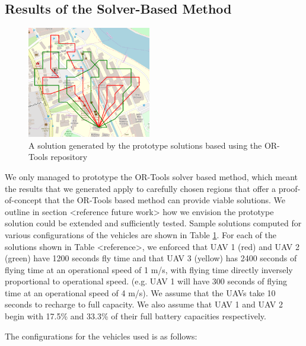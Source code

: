 \subsection{Results of the Solver-Based Method}

\begin{figure}
\begin{center}
\includegraphics[width=0.48\textwidth]{Chapters/MultiAgentCoverage/MultipleTravellingSalesman/Figs/VRPPrototypeSolution.png}
\caption{A solution generated by the prototype solutions based using the OR-Tools repository}
\label{fig:ORToolsVRPSoln}
\end{center}
\end{figure}

We only managed to prototype the OR-Tools solver based method, which meant the results that we generated apply to carefully chosen regions that offer a proof-of-concept that the OR-Tools based method can provide viable solutions. We outline in section <reference future work> how we envision the prototype solution could be extended and sufficiently tested. Sample solutions computed for various configurations of the vehicles are shown in Table \ref{fig:ORToolsVRPSoln}. For each of the solutions shown in Table <reference>, we enforced that UAV 1 (red) and UAV 2 (green) have 1200 seconds fly time and that UAV 3 (yellow) has 2400 seconds of flying time at an operational speed of 1 m/s, with flying time directly inversely proportional to operational speed. (e.g. UAV 1 will have 300 seconds of flying time at an operational speed of 4 m/s). We assume that the UAVs take 10 seconds to recharge to full capacity. We also assume that UAV 1 and UAV 2 begin with 17.5\% and 33.3\% of their full battery capacities respectively.

The configurations for the vehicles used is as follows:

